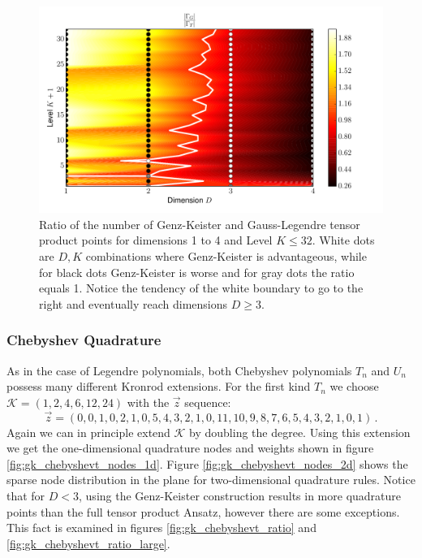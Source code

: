 \documentclass[a4paper,10pt]{article}
\begin{document}
\begin{figure}[h]
  \centering
  \includegraphics[width=0.8\linewidth]{./img/gk_legendre_ratio_large.pdf}
  \caption{Ratio of the number of Genz-Keister and Gauss-Legendre tensor product
  points for dimensions 1 to 4 and Level $K \leq 32$. White dots are $D,K$
  combinations where Genz-Keister is advantageous, while for black dots
  Genz-Keister is worse and for gray dots the ratio equals 1. Notice the tendency
  of the white boundary to go to the right and eventually reach dimensions $D \geq 3$.}
  \label{fig:gk_legendre_ratio_large}
\end{figure}

\FloatBarrier
\subsubsection{Chebyshev Quadrature}

As in the case of Legendre polynomials, both Chebyshev polynomials $T_n$
and $U_n$ possess many different Kronrod extensions. For the first kind $T_n$
we choose $\mathcal{K} = (1, 2, 4, 6, 12, 24)$ with the $\vec{z}$ sequence:
\begin{equation*}
  \vec{z} = (0, 0, 1, 0, 2, 1, 0, 5, 4, 3, 2, 1, 0, 11, 10, 9, 8, 7, 6, 5, 4, 3, 2, 1, 0, 1) \,.
\end{equation*}
Again we can in principle extend $\mathcal{K}$ by doubling the degree.
Using this extension we get the one-dimensional quadrature nodes and weights shown
in figure \ref{fig:gk_chebyshevt_nodes_1d}.
Figure \ref{fig:gk_chebyshevt_nodes_2d} shows the sparse
node distribution in the plane for two-dimensional quadrature rules.
Notice that for $D < 3$, using the Genz-Keister construction results
in more quadrature points than the full tensor product Ansatz, however there
are some exceptions. This fact is examined in figures \ref{fig:gk_chebyshevt_ratio}
and \ref{fig:gk_chebyshevt_ratio_large}.
\end{document}
